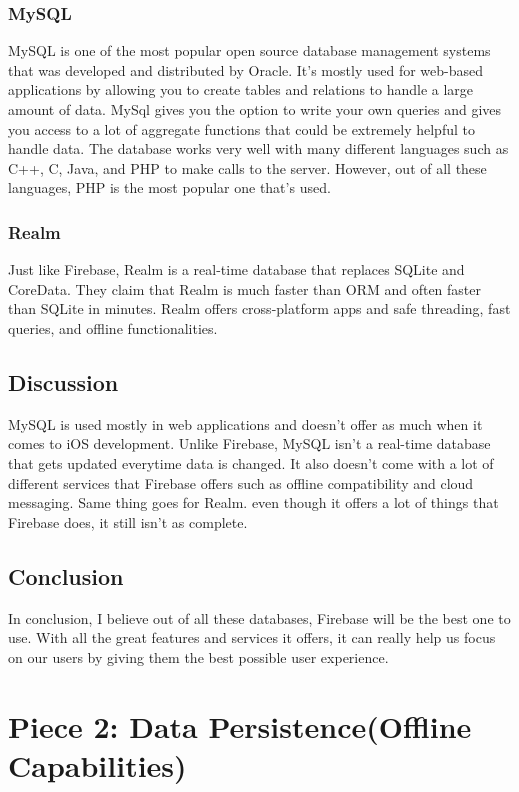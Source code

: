 \documentclass[onecolumn, draftclsnofoot,10pt, compsoc]{IEEEtran}
\begin{document}
\subsubsection{MySQL\cite{MySql}}
MySQL is one of the most popular open source database management systems that was developed and distributed by Oracle. It's mostly used for web-based applications by allowing you to create tables and relations to handle a large amount of data. MySql gives you the option to write your own queries and gives you access to a lot of aggregate functions that could be extremely helpful to handle data. The database works very well with many different languages such as C++, C, Java, and PHP to make calls to the server. However, out of all these languages, PHP is the most popular one that's used.

\subsubsection{Realm\cite{Realm}}
Just like Firebase, Realm is a real-time database that replaces SQLite and CoreData. They claim that Realm is much faster than ORM and often faster than SQLite in minutes. Realm offers cross-platform apps and safe threading, fast queries, and offline functionalities.

\subsection{Discussion}
MySQL is used mostly in web applications and doesn't offer as much when it comes to iOS development. Unlike Firebase, MySQL isn't a real-time database that gets updated everytime data is changed. It also doesn't come with a lot of different services that Firebase offers such as offline compatibility and cloud messaging. Same thing goes for Realm. even though it offers a lot of things that Firebase does, it still isn't as complete. 

\subsection{Conclusion}
In conclusion, I believe out of all these databases, Firebase will be the best one to use. With all the great features and services it offers, it can really help us focus on our users by giving them the best possible user experience. 

\section{Piece 2: Data Persistence(Offline Capabilities)}
\end{document}
